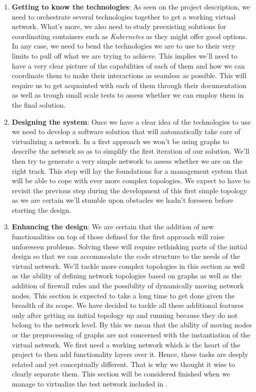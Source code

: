 \documentclass[12pt]{article}
\begin{document}
        \begin{enumerate}
            \item \textbf{Getting to know the technologies}: As seen on the project description, we need to orchestrate several technologies together to get a working virtual network. What's more, we also need to study preexisting solutions for coordinating containers such as \textit{Kubernetes} as they might offer good options. In any case, we need to bend the technologies we are to use to their very limits to pull off what we are trying to achieve. This implies we'll need to have a very clear picture of the capabilities of each of them and how we can coordinate them to make their interactions as seamless as possible. This will require us to get acquainted with each of them through their documentation as well as trough small scale tests to assess whether we can employ them in the final solution.
            \item \textbf{Designing the system}: Once we have a clear idea of the technologies to use we need to develop a software solution that will automatically take care of virtualizing a network. In a first approach we won't be using graphs to describe the network so as to simplify the first iteration of our solution. We'll then try to generate a very simple network to assess whether we are on the right track. This step will lay the foundations for a management system that will be able to cope with ever more complex topologies. We expect to have to revisit the previous step during the development of this first simple topology as we are certain we'll stumble upon obstacles we hadn't foreseen before starting the design.
            \item \textbf{Enhancing the design}: We are certain that the addition of new functionalities on top of those defined for the first approach will raise unforeseen problems. Solving these will require rethinking parts of the initial design so that we can accommodate the code structure to the needs of the virtual network. We'll tackle more complex topologies in this section as well as the ability of defining network topologies based on graphs as well as the addition of firewall rules and the possibility of dynamically moving network nodes. This section is expected to take a long time to get done given the breadth of its scope. We have decided to tackle all these additional features only after getting an initial topology up and running because they do not belong to the network level. By this we mean that the ability of moving nodes or the preprocessing of graphs are not concerned with the instantiation of the virtual network. We first need a working network which is the heart of the project to then add functionality layers over it. Hence, these tasks are deeply related and yet conceptually different. That is why we thought it wise to clearly separate them. This section will be considered finished when we manage to virtualize the test network included in \cite{bib:ICS}.

\end{enumerate}
\end{document}
